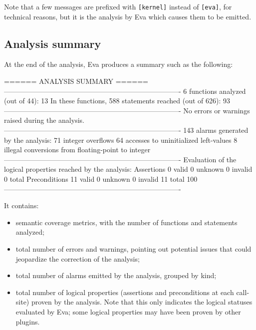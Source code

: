 \documentclass[web]{frama-c-book}
\newcommand{\Eva}{\textsf{Eva}}
\begin{document}
Note that a few messages are prefixed with \verb|[kernel]| instead of
\verb|[eva]|, for technical reasons, but it is the analysis by \Eva{}
which causes them to be emitted.

\subsection{Analysis summary}

At the end of the analysis, \Eva{} produces a summary such as the
following:

\begin{logs}
 ====== ANALYSIS SUMMARY ======
  ----------------------------------------------------------------------------
  6 functions analyzed (out of 44): 13%
  In these functions, 588 statements reached (out of 626): 93%
  ----------------------------------------------------------------------------
  No errors or warnings raised during the analysis.
  ----------------------------------------------------------------------------
  143 alarms generated by the analysis:
      71 integer overflows
      64 accesses to uninitialized left-values
       8 illegal conversions from floating-point to integer
  ----------------------------------------------------------------------------
  Evaluation of the logical properties reached by the analysis:
    Assertions        0 valid     0 unknown     0 invalid      0 total
    Preconditions    11 valid     0 unknown     0 invalid     11 total
  100%
  ----------------------------------------------------------------------------
\end{logs}

It contains:

\begin{itemize}
\item semantic coverage metrics, with the number of functions and
  statements analyzed;
\item total number of errors and warnings, pointing out potential issues that
  could jeopardize the correction of the analysis;
\item total number of alarms emitted by the analysis, grouped by kind;
\item total number of logical properties (assertions and preconditions at each call-site)
  proven by the analysis.
  Note that this only indicates the logical statuses evaluated by \Eva{};
  some logical properties may have been proven by other plugins.
\end{itemize}
\end{document}
